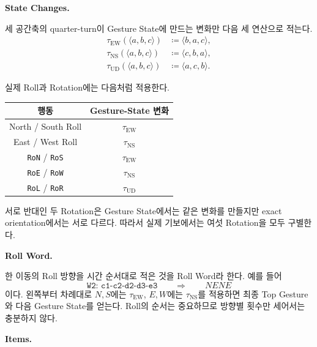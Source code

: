 \medskip
\noindent\textbf{State Changes.}

세 공간축의 quarter-turn이 Gesture State에 만드는 변화만 다음 세 연산으로 적는다.
\[
\begin{aligned}
    \tau_{\mathrm{EW}}(\langle a,b,c\rangle)&\coloneqq\langle b,a,c\rangle,\\
    \tau_{\mathrm{NS}}(\langle a,b,c\rangle)&\coloneqq\langle c,b,a\rangle,\\
    \tau_{\mathrm{UD}}(\langle a,b,c\rangle)&\coloneqq\langle a,c,b\rangle.
\end{aligned}
\]

실제 Roll과 Rotation에는 다음처럼 적용한다.

\begin{center}
    \renewcommand{\arraystretch}{1.16}
    \begin{tabular}{@{}cc@{}}
        \toprule
        행동 & Gesture-State 변화 \\
        \midrule
        North / South Roll & $\tau_{\mathrm{EW}}$ \\
        East / West Roll & $\tau_{\mathrm{NS}}$ \\
        \texttt{RoN} / \texttt{RoS} & $\tau_{\mathrm{EW}}$ \\
        \texttt{RoE} / \texttt{RoW} & $\tau_{\mathrm{NS}}$ \\
        \texttt{RoL} / \texttt{RoR} & $\tau_{\mathrm{UD}}$ \\
        \bottomrule
    \end{tabular}
\end{center}

서로 반대인 두 Rotation은 Gesture State에서는 같은 변화를 만들지만 exact orientation에서는 서로 다르다. 따라서 실제 기보에서는 여섯 Rotation을 모두 구별한다.

\medskip
\noindent\textbf{Roll Word.}

한 이동의 Roll 방향을 시간 순서대로 적은 것을 Roll Word라 한다. 예를 들어
\[
    \texttt{W2: c1-c2-d2-d3-e3}
    \qquad\Longrightarrow\qquad
    NENE
\]
이다. 왼쪽부터 차례대로 $N,S$에는 $\tau_{\mathrm{EW}}$, $E,W$에는 $\tau_{\mathrm{NS}}$를 적용하면 최종 Top Gesture와 다음 Gesture State를 얻는다. Roll의 순서는 중요하므로 방향별 횟수만 세어서는 충분하지 않다.

\medskip
\noindent\textbf{Items.}

